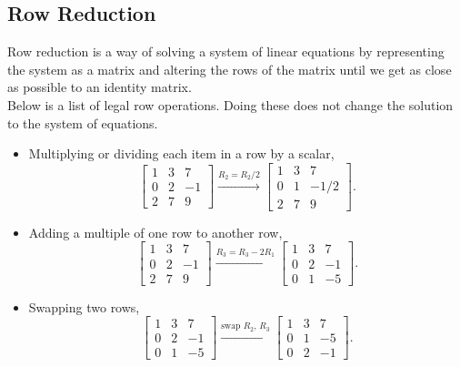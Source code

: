 \subsection{Row Reduction}
\noindent
Row reduction is a way of solving a system of linear equations by representing the system as a matrix and altering the rows of the matrix until we get as close as possible to an identity matrix.\\

\noindent
Below is a list of legal row operations. Doing these does not change the solution to the system of equations.
\begin{itemize}
	\item Multiplying or dividing each item in a row by a scalar,
		\begin{equation*}
			\begin{bmatrix}
				1 & 3 & 7 \\
				0 & 2 & -1 \\
				2 & 7 & 9
			\end{bmatrix}
			\stackrel{R_2 = R_2/2}{\to}
			\begin{bmatrix}
				1 & 3 & 7 \\
				0 & 1 & -1/2 \\
				2 & 7 & 9
			\end{bmatrix}.
		\end{equation*}
	\item Adding a multiple of one row to another row,
		\begin{equation*}
			\begin{bmatrix}
				1 & 3 & 7 \\
				0 & 2 & -1 \\
				2 & 7 & 9
			\end{bmatrix}
			\stackrel{R_3 = R_3 - 2R_1}{\to}
			\begin{bmatrix}
				1 & 3 & 7 \\
				0 & 2 & -1 \\
				0 & 1 & -5
			\end{bmatrix}.
		\end{equation*}
	\item Swapping two rows,
		\begin{equation*}
			\begin{bmatrix}
				1 & 3 & 7 \\
				0 & 2 & -1 \\
				0 & 1 & -5
			\end{bmatrix}
			\stackrel{\text{swap } R_2 \text{, } R_3}{\to}
			\begin{bmatrix}
				1 & 3 & 7 \\
				0 & 1 & -5 \\
				0 & 2 & -1
			\end{bmatrix}.
		\end{equation*}
\end{itemize}

